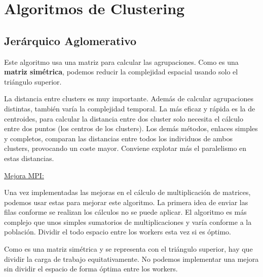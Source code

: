 \newpage %
\section{Algoritmos de Clustering}

	\subsection{Jerárquico Aglomerativo}
		Este algoritmo usa una matriz para calcular las agrupaciones. Como es una \textbf{matriz simétrica}, podemos reducir la complejidad espacial usando solo el triángulo superior. 
		
		La distancia entre clusters es muy importante. Además de calcular agrupaciones distintas, también varía la complejidad temporal. La más eficaz y rápida es la de centroides, para calcular la distancia entre dos cluster solo necesita el cálculo entre dos puntos (los centros de los clusters). Los demás métodos, enlaces simples y completos, comparan las distancias entre todos los individuos de ambos clusters, provocando un coste mayor. Conviene explotar más el paralelismo en estas distancias.
		
		\begin{flushleft}
			\underline{Mejora MPI:}
		\end{flushleft}
		Una vez implementadas las mejoras en el cálculo de multiplicación de matrices, podemos usar estas para mejorar este algoritmo. La primera idea de enviar las filas conforme se realizan los cálculos no se puede aplicar. El algoritmo es más complejo que unos simples sumatorios de multiplicaciones y varía conforme a la población. Dividir el todo espacio entre los workers esta vez si es óptimo.
		
		Como es una matriz simétrica y se representa con el triángulo superior, hay que dividir la carga de trabajo equitativamente. No podemos implementar una mejora sin dividir el espacio de forma óptima entre los workers. 
		
